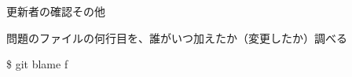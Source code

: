 
\begin{frame}[t]{更新者の確認}{その他}

  問題のファイルの何行目を、誰がいつ加えたか（変更したか）調べる
  \vspace{4ex}

  \$ git blame f
  \vspace{2ex}

\end{frame}
